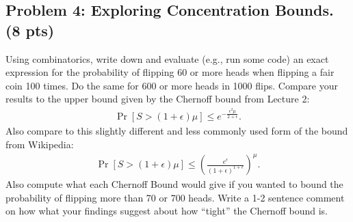 \documentclass[10pt]{article}
\begin{document}
\subsection{Problem 4: Exploring Concentration Bounds. (8 pts)}
Using combinatorics, write down and evaluate (e.g., run some code) an exact expression for the probability of flipping 60 or more heads when flipping a fair coin 100 times. Do the same for 600 or more heads in 1000 flips. Compare your results to the upper bound given by the Chernoff bound from Lecture 2:
\begin{align*}
	\Pr[S > (1+\epsilon)\mu] \leq e^{-\frac{\epsilon^2\mu}{2+\epsilon}}.
\end{align*}
Also compare to this slightly different and less commonly used form of the bound from Wikipedia:
\begin{align*}
	\Pr[S > (1+\epsilon)\mu] \leq \left(\frac{e^\epsilon}{(1+\epsilon)^{1+\epsilon}}\right)^{\mu}.
\end{align*}
Also compute what each Chernoff Bound would give if you wanted to bound the probability of flipping more than 70 or 700 heads. 
Write a 1-2 sentence comment on how what your findings suggest about how ``tight'' the Chernoff bound is. 
\end{document}
